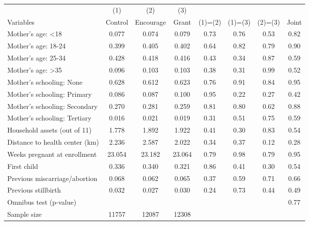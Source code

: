 \small\begin{tabular}{lccccccc} 
\toprule 
                       &    (1)        &   (2)         &   (3)         &                       &                       &                       &  \\
Variables      & Control       & Encourage     & Grant         & (1)=(2)       & (1)=(3)       & (2)=(3)       & Joint\\
\midrule 
Mother's age: <18 & 0.077 & 0.074  & 0.079 & 0.73 & 0.76 & 0.53 & 0.82\\
Mother's age: 18-24 & 0.399 & 0.405  & 0.402 & 0.64 & 0.82 & 0.79 & 0.90\\
Mother's age: 25-34 & 0.428 & 0.418  & 0.416 & 0.43 & 0.34 & 0.87 & 0.59\\
Mother's age: >35 & 0.096 & 0.103  & 0.103 & 0.38 & 0.31 & 0.99 & 0.52\\
Mother's schooling: None & 0.628 & 0.612  & 0.623 & 0.76 & 0.91 & 0.84 & 0.95\\
Mother's schooling: Primary & 0.086 & 0.087  & 0.100 & 0.95 & 0.22 & 0.27 & 0.42\\
Mother's schooling: Secondary & 0.270 & 0.281  & 0.259 & 0.81 & 0.80 & 0.62 & 0.88\\
Mother's schooling: Tertiary & 0.016 & 0.021  & 0.019 & 0.31 & 0.51 & 0.75 & 0.59\\
Household assets (out of 11) & 1.778 & 1.892  & 1.922 & 0.41 & 0.30 & 0.83 & 0.54\\
Distance to health center (km) & 2.236 & 2.587  & 2.022 & 0.34 & 0.37 & 0.12 & 0.28\\
Weeks pregnant at enrollment & 23.054 & 23.182  & 23.064 & 0.79 & 0.98 & 0.79 & 0.95\\
First child & 0.336 & 0.340  & 0.321 & 0.86 & 0.41 & 0.30 & 0.54\\
Previous miscarriage/abortion & 0.068 & 0.062  & 0.065 & 0.37 & 0.59 & 0.71 & 0.66\\
Previous stillbirth & 0.032 & 0.027  & 0.030 & 0.24 & 0.73 & 0.44 & 0.49\\
 Omnibus test (p-value) &   &   &  &  &  &  & 0.77  \\
\midrule 
 Sample size & 11757 & 12087  & 12308  &  &  &  &  \\
 \bottomrule 
\end{tabular} 
